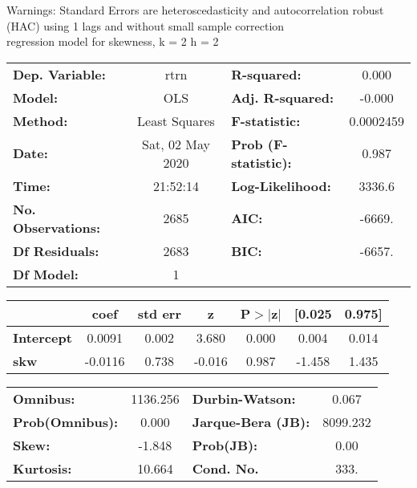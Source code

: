 Warnings: \newline
 [1] Standard Errors are heteroscedasticity and autocorrelation robust (HAC) using 1 lags and without small sample correction\\ 

regression model for skewness, k = 2 h = 2\begin{center}
\begin{tabular}{lclc}
\toprule
\textbf{Dep. Variable:}    &       rtrn       & \textbf{  R-squared:         } &     0.000   \\
\textbf{Model:}            &       OLS        & \textbf{  Adj. R-squared:    } &    -0.000   \\
\textbf{Method:}           &  Least Squares   & \textbf{  F-statistic:       } & 0.0002459   \\
\textbf{Date:}             & Sat, 02 May 2020 & \textbf{  Prob (F-statistic):} &    0.987    \\
\textbf{Time:}             &     21:52:14     & \textbf{  Log-Likelihood:    } &    3336.6   \\
\textbf{No. Observations:} &        2685      & \textbf{  AIC:               } &    -6669.   \\
\textbf{Df Residuals:}     &        2683      & \textbf{  BIC:               } &    -6657.   \\
\textbf{Df Model:}         &           1      & \textbf{                     } &             \\
\bottomrule
\end{tabular}
\begin{tabular}{lcccccc}
                   & \textbf{coef} & \textbf{std err} & \textbf{z} & \textbf{P$> |$z$|$} & \textbf{[0.025} & \textbf{0.975]}  \\
\midrule
\textbf{Intercept} &       0.0091  &        0.002     &     3.680  &         0.000        &        0.004    &        0.014     \\
\textbf{skw}       &      -0.0116  &        0.738     &    -0.016  &         0.987        &       -1.458    &        1.435     \\
\bottomrule
\end{tabular}
\begin{tabular}{lclc}
\textbf{Omnibus:}       & 1136.256 & \textbf{  Durbin-Watson:     } &    0.067  \\
\textbf{Prob(Omnibus):} &   0.000  & \textbf{  Jarque-Bera (JB):  } & 8099.232  \\
\textbf{Skew:}          &  -1.848  & \textbf{  Prob(JB):          } &     0.00  \\
\textbf{Kurtosis:}      &  10.664  & \textbf{  Cond. No.          } &     333.  \\
\bottomrule
\end{tabular}
\end{center}

